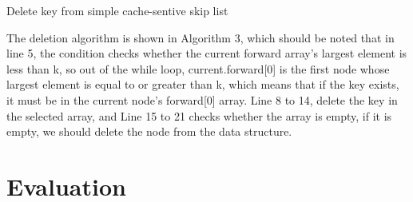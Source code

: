 \documentclass[sigconf, nonacm, letterpaper,top=2cm,bottom=2cm,left=3cm,right=3cm,marginparwidth=1.75cm]{acmart}
\begin{document}
\begin{algorithm}
        \caption{Delete key from simple cache-sentive skip list}
\end{algorithm}
    



The deletion algorithm is shown in Algorithm 3, which should be noted that in line 5,  the condition checks whether the current forward array's largest element is less than k, so out of the while loop,  current.forward[0] is the first node whose largest element is equal to or greater than k, which means that if the key exists, it must be in the current node’s forward[0] array. Line 8 to 14, delete the key in the selected array, and Line 15 to 21 checks whether the array is empty, if it is empty, we should delete the node from the data structure.


\section{Evaluation}
\end{document}

